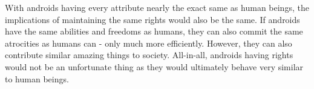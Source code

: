 With androids having every attribute nearly the exact same as human beings, the implications of maintaining the same rights would also be the same. If androids have the same abilities and freedoms as humans, they can also commit the same atrocities as humans can - only much more efficiently. However, they can also contribute similar amazing things to society. All-in-all, androids having rights would not be an unfortunate thing as they would ultimately behave very similar to human beings.